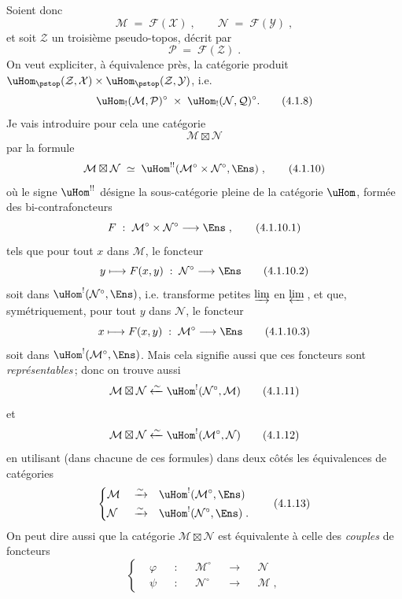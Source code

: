 Soient donc
\[
\mathcal{M} \;=\; \mathcal{F}(\mathcal{X})\;, \qquad \mathcal{N} \;=\; \mathcal{F}(\mathcal{Y})\;,
\tag*{(4.1.6)}
\]
et soit $\mathcal{Z}$ un troisième pseudo-topos, décrit par
\[
\mathcal{P} \;=\; \mathcal{F}(\mathcal{Z})\;.
\tag*{(4.1.7)}
\]
On veut expliciter, à équivalence près, la catégorie produit $\uHom_{\pstop}(\mathcal{Z},\mathcal{X})\times\uHom_{\pstop}(\mathcal{Z},\mathcal{Y})$, i.e.
\[
\uHom_!(\mathcal{M},\mathcal{P})^\circ \;\times\; \uHom_!(\mathcal{N},\mathcal{Q})^\circ.
\tag*{(4.1.8)}
\] %
Je vais introduire pour cela une catégorie
\[
\mathcal{M}\boxtimes\mathcal{N}
\tag*{(4.1.9)}
\]
par la formule
\[
\mathcal{M}\boxtimes\mathcal{N} \;\simeq\; \uHom^{!!}(\mathcal{M}^\circ\times\mathcal{N}^\circ,\Ens)\;,
\tag*{(4.1.10)}
\]
où le signe $\uHom^{!!}$ désigne la sous-catégorie pleine de la catégorie $\uHom$, formée des bi-contrafoncteurs %
\[
F \;:\; \mathcal{M}^\circ\times\mathcal{N}^\circ \longrightarrow \Ens\;,
\tag*{(4.1.10.1)}
\]
tels que pour tout $x$ dans $\mathcal{M}$, le foncteur
\[
y \longmapsto F(x,y) \;:\; \mathcal{N}^\circ \longrightarrow \Ens
\tag*{(4.1.10.2)}
\]
soit dans $\uHom^!(\mathcal{N}^\circ,\Ens)$, i.e. transforme petites $\varinjlim$ en $\varprojlim$\,, et que, symétriquement, pour tout $y$ dans $\mathcal{N}$, le foncteur
\[
x \longmapsto F(x,y) \;:\; \mathcal{M}^\circ \longrightarrow \Ens
\tag*{(4.1.10.3)}
\]
soit dans $\uHom^!(\mathcal{M}^\circ,\Ens)$. Mais cela signifie aussi que ces foncteurs sont \textit{représentables}\,; donc on trouve aussi
\[
\mathcal{M}\boxtimes\mathcal{N} \xleftarrow{\sim} \uHom^!(\mathcal{N}^\circ,\mathcal{M})
\tag*{(4.1.11)}
\]
et
\[
\mathcal{M}\boxtimes\mathcal{N} \xleftarrow{\sim} \uHom^!(\mathcal{M}^\circ,\mathcal{N})
\tag*{(4.1.12)}
\]
en utilisant (dans chacune de ces formules) dans deux côtés les équivalences de catégories
\[
\left\{
\begin{aligned}
&\mathcal{M} &&\xrightarrow{\sim} &&\uHom^!(\mathcal{M}^\circ,\Ens)\\
&\mathcal{N} &&\xrightarrow{\sim} &&\uHom^!(\mathcal{N}^\circ,\Ens)\;.
\end{aligned}
\right.
\tag*{(4.1.13)}
\]
On peut dire aussi que la catégorie $\mathcal{M}\boxtimes\mathcal{N}$ est équivalente à celle des \textit{couples} de foncteurs
\[
\left\{
\begin{aligned}
&\varphi &&: &&\mathcal{M}^\circ &&\longrightarrow &&\mathcal{N}\\
&\psi &&: &&\mathcal{N}^\circ &&\longrightarrow &&\mathcal{M}\;,
\end{aligned}
\right.
\tag*{(4.1.14)}
\]
